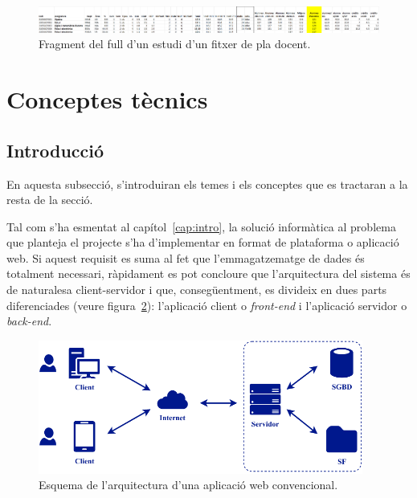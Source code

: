 \documentclass[a4paper,12pt]{ThesisStyle}
\begin{document}
\begin{figure}[H]
  \centering
  \includegraphics[width=\textwidth]{assets/figs/fitxerPlaDocent.png}
  \caption{\label{img:frag_pla_docent}Fragment del full d'un estudi d'un fitxer de pla docent.}
\end{figure}


\section{Conceptes tècnics}
\label{sec:conceptes_tecnics}

\subsection{Introducció}
\label{subsec:intro_conceptes_tecnics}

En aquesta subsecció, s'introduiran els temes i els conceptes que es tractaran a la resta de la secció.

Tal com s'ha esmentat al capítol~\ref{cap:intro}, la solució informàtica al problema que planteja el projecte s'ha d'implementar en format de plataforma o aplicació web. Si aquest requisit es suma al fet que l'emmagatzematge de dades és totalment necessari, ràpidament es pot concloure que l'arquitectura del sistema és de naturalesa client-servidor i que, consegüentment, es divideix en dues parts diferenciades (veure figura~\ref{img:esquema_web}): l'aplicació client o \textit{front-end} i l'aplicació servidor o \textit{back-end}.

\begin{figure}[H]
  \centering
  \includegraphics[width=0.95\textwidth]{assets/figs/esquemaWeb.pdf}
  \caption{\label{img:esquema_web}Esquema de l'arquitectura d'una aplicació web convencional.}
\end{figure}
\end{document}
